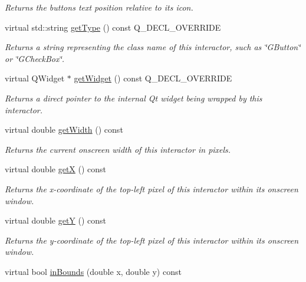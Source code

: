 \begin{DoxyCompactItemize}
\begin{DoxyCompactList}\small\item\em Returns the button\textquotesingle{}s text position relative to its icon. \end{DoxyCompactList}\item 
virtual std\+::string \mbox{\hyperlink{classGButton_a9896d58fcfebbf1025aeeb5b8b9ede80}{get\+Type}} () const Q\+\_\+\+D\+E\+C\+L\+\_\+\+O\+V\+E\+R\+R\+I\+DE
\begin{DoxyCompactList}\small\item\em Returns a string representing the class name of this interactor, such as \char`\"{}\+G\+Button\char`\"{} or \char`\"{}\+G\+Check\+Box\char`\"{}. \end{DoxyCompactList}\item 
virtual Q\+Widget $\ast$ \mbox{\hyperlink{classGButton_a326ee51b5561f807df7b29a1c101f7fd}{get\+Widget}} () const Q\+\_\+\+D\+E\+C\+L\+\_\+\+O\+V\+E\+R\+R\+I\+DE
\begin{DoxyCompactList}\small\item\em Returns a direct pointer to the internal Qt widget being wrapped by this interactor. \end{DoxyCompactList}\item 
virtual double \mbox{\hyperlink{classGInteractor_a0ed2965abd4f5701d2cadf71239faf19}{get\+Width}} () const
\begin{DoxyCompactList}\small\item\em Returns the current onscreen width of this interactor in pixels. \end{DoxyCompactList}\item 
virtual double \mbox{\hyperlink{classGInteractor_a344385751bee0720059403940d57a13e}{getX}} () const
\begin{DoxyCompactList}\small\item\em Returns the x-\/coordinate of the top-\/left pixel of this interactor within its onscreen window. \end{DoxyCompactList}\item 
virtual double \mbox{\hyperlink{classGInteractor_aafa51c7f8f38a09febbb9ce7853f77b4}{getY}} () const
\begin{DoxyCompactList}\small\item\em Returns the y-\/coordinate of the top-\/left pixel of this interactor within its onscreen window. \end{DoxyCompactList}\item 
virtual bool \mbox{\hyperlink{classGInteractor_afc480f652b8c5f1fb255e2269ce68879}{in\+Bounds}} (double x, double y) const

\end{DoxyCompactItemize}
